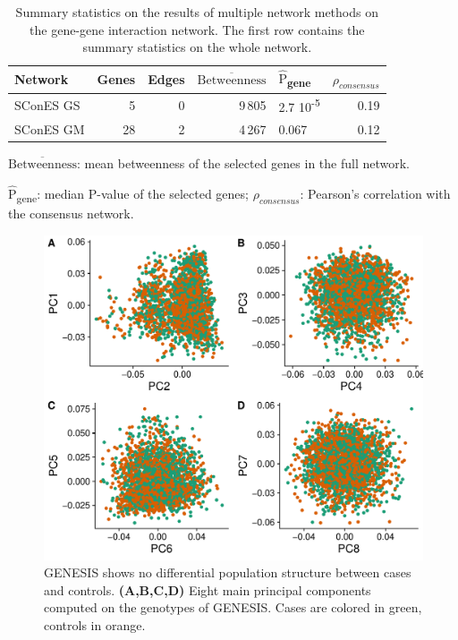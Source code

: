 \documentclass[twocolumn, 10pt]{article}
\newcommand{\mean}[1]{$\overline{\mbox{#1}}$}
\newcommand{\median}[1]{$\hat{\mbox{#1}}$}
\begin{document}
\begin{table}[htbp]
\begin{threeparttable}
  \caption{\label{tab:scones_gene_solutions}
Summary statistics on the results of multiple network methods on the gene-gene interaction network. The first row contains the summary statistics on the whole network.}
\centering
\begin{tabular}{lrrrlr}
Network & Genes & Edges & \mean{Betweenness} & \median{P}\textsubscript{gene} & $\rho_{consensus}$\\
\hline
SConES GS & 5 & 0 & 9\,805 & 2.7 \texttimes{} 10\textsuperscript{-5} & 0.19\\
SConES GM & 28 & 2 & 4\,267 & 0.067 & 0.12\\
\end{tabular}
\begin{tablenotes}
\item \mean{Betweenness}: mean betweenness of the selected genes in the full network.
\item \median{P}\textsubscript{gene}: median P-value of the selected genes; $\rho_{consensus}$: Pearson's correlation with the consensus network.
\end{tablenotes}
\end{threeparttable}
\end{table}

\begin{figure}[htbp]
\centering
\includegraphics[width=.9\linewidth]{./figures/sfigure_1.pdf}
\caption{\label{sfig:pcs} GENESIS shows no differential population structure between cases and controls. \textbf{(A,B,C,D)} Eight main principal components computed on the genotypes of GENESIS. Cases are colored in green, controls in orange.}
\end{figure}
\end{document}
